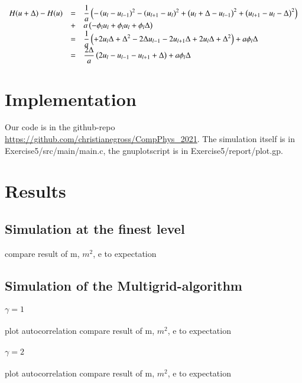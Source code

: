 \documentclass{scrartcl}
\begin{document}
\[\begin{array}{>{\displaystyle}r>{\displaystyle}c>{\displaystyle}l}
H(u+\Delta)-H(u)&=&\frac{1}{a}\left( -\left(u_l-u_{l-1} \right)^2-\left(u_{l+1}-u_{l}  \right)^2+\left(u_l+\Delta-u_{l-1}  \right)^2+\left( u_{l+1}-u_{l}-\Delta \right)^2\right) \\&+&a\left( -\phi_lu_l+\phi_lu_l+\phi_l\Delta\right) \\



&=&\frac{1}{a}\left(+2u_l\Delta+\Delta^2-2\Delta u_{l-1}-2u_{l+1}\Delta+2u_l\Delta+\Delta^2 \right) +a\phi_l\Delta \\

&=&\frac{2\Delta}{a}\left(2u_l-u_{l-1}-u_{l+1}+\Delta \right)+ a\phi_l\Delta

\end{array}\]

\section{Implementation}

Our code is in the github-repo \url{https://github.com/christianegross/CompPhys\_2021}. The simulation itself is in Exercise5/src/main/main.c, the gnuplotscript is in Exercise5/report/plot.gp. 

\section{Results}
\subsection{Simulation at the finest level}
compare result of m, $m^2$, e to expectation

\subsection{Simulation of the Multigrid-algorithm}
\paragraph{$\gamma=1$}
plot autocorrelation
compare result of m, $m^2$, e to expectation
\paragraph{$\gamma=2$}
plot autocorrelation
compare result of m, $m^2$, e to expectation

\newpage	
\listoffigures
\printbibliography
\end{document}
